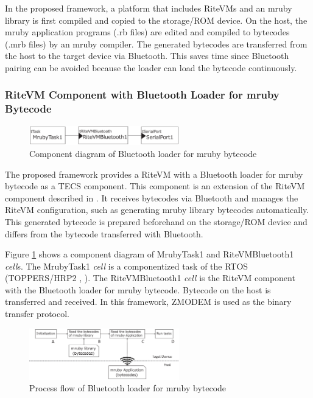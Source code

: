 \documentclass[S,R,E]{article/compsoft}
\begin{document}
In the proposed framework, a platform that includes RiteVMs and an mruby library is first compiled and copied to the storage/ROM device.
On the host, the mruby application programs (.rb files) are edited and compiled to bytecodes (.mrb files) by an mruby compiler.
The generated bytecodes are transferred from the host to the target device via Bluetooth.
This saves time since Bluetooth pairing can be avoided because the loader can load the bytecode continuously.

\subsubsection{RiteVM Component with Bluetooth Loader for mruby Bytecode}
\begin{figure}[t]
    \centering
    \includegraphics[width=6.5cm,clip]{figure/component_bluetooth.eps}
\caption{Component diagram of Bluetooth loader for mruby bytecode}
\label{fig:component_bluetooth}
\end{figure}
The proposed framework provides a RiteVM with a Bluetooth loader for mruby bytecode as a TECS component.
This component is an extension of the RiteVM component described in \cite{par:mrubyonTECS}.
It receives bytecodes via Bluetooth and manages the RiteVM configuration, such as generating mruby library bytecodes automatically.
This generated bytecode is prepared beforehand on the storage/ROM device and differs from the bytecode transferred with Bluetooth.

Figure \ref{fig:component_bluetooth} shows a component diagram of MrubyTask1 and RiteVMBluetooth1 {\it cell}s.
The MrubyTask1 {\it cell} is a componentized task of the RTOS (TOPPERS/HRP2 \cite{url:HRP2}, \cite{par:hr-tecs}).
The RiteVMBluetooth1 {\it cell} is the RiteVM component with the Bluetooth loader for mruby bytecode.
Bytecode on the host is transferred and received.
In this framework, ZMODEM \cite{par:zmodem} is used as the binary transfer protocol.

\begin{figure}[t]
    \centering
    \includegraphics[width=6.5cm,clip]{figure/control_flow.eps}
\caption{Process flow of Bluetooth loader for mruby bytecode}
\label{fig:control_flow}
\end{figure}
\end{document}
